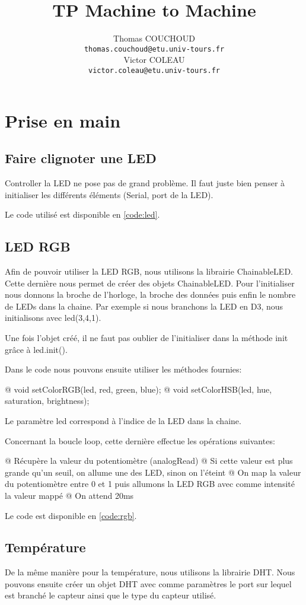 \documentclass{report}
\title{TP Machine to Machine}
\author{Thomas COUCHOUD\\\texttt{thomas.couchoud@etu.univ-tours.fr}\\Victor COLEAU\\\texttt{victor.coleau@etu.univ-tours.fr}}
\begin{document}
	\mccTitle
	
	\chapter{Prise en main}
		\section{Faire clignoter une LED}
			Controller la LED ne pose pas de grand problème.
			Il faut juste bien penser à initialiser les différents éléments (Serial, port de la LED).
			
			Le code utilisé est disponible en \autoref{code:led}.
			
		\section{LED RGB}
			Afin de pouvoir utiliser la LED RGB, nous utilisons la librairie ChainableLED.
			Cette dernière nous permet de créer des objets ChainableLED.
			Pour l'initialiser nous donnons la broche de l'horloge, la broche des données puis enfin le nombre de LEDs dans la chaine.
			Par exemple si nous branchons la LED en D3, nous initialisons avec led(3,4,1).
			
			Une fois l'objet créé, il ne faut pas oublier de l'initialiser dans la méthode init grâce à led.init().
			
			Dans le code nous pouvons ensuite utiliser les méthodes fournies:
			\begin{easylist}[itemize]
				@ void setColorRGB(led, red, green, blue);
				@ void setColorHSB(led, hue, saturation, brightness);
			\end{easylist}
			
  			Le paramètre led correspond à l'indice de la LED dans la chaine.
  			
  			Concernant la boucle loop, cette dernière effectue les opérations suivantes:
  			\begin{easylist}[itemize]
  				@ Récupère la valeur du potentiomètre (analogRead)
  				@ Si cette valeur est plus grande qu'un seuil, on allume une des LED, sinon on l'éteint
  				@ On map la valeur du potentiomètre entre 0 et 1 puis allumons la LED RGB avec comme intensité la valeur mappé
  				@ On attend 20ms
  			\end{easylist}
  			
  			Le code est disponible en \autoref{code:rgb}.
  			
  		\section{Température}
  			De la même manière pour la température, nous utilisons la librairie DHT.
  			Nous pouvons ensuite créer un objet DHT avec comme paramètres le port sur lequel est branché le capteur ainsi que le type du capteur utilisé.
  			
\end{document}
